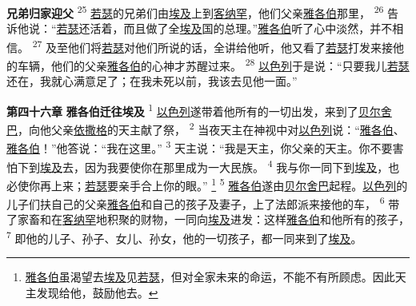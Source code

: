 \textbf{兄弟归家迎父 }
\textsuperscript{25}
\uline{若瑟}的兄弟们由\uline{埃及}上到\uline{客纳罕}，他们父亲\uline{雅各伯}那里，
\textsuperscript{26}
告诉他说：“\uline{若瑟}还活着，而且做了全\uline{埃及}国的总理。”\uline{雅各伯}听了心中淡然，并不相信。
\textsuperscript{27}
及至他们将\uline{若瑟}对他们所说的话，全讲给他听，他又看了\uline{若瑟}打发来接他的车辆，他们的父亲\uline{雅各伯}的心神才苏醒过来。
\textsuperscript{28}
\uline{以色列}于是说：“只要我儿\uline{若瑟}还在，我就心满意足了；在我未死以前，我该去见他一面。”

\textbf{第四十六章 }
\textbf{雅各伯迁往埃及 }
\textsuperscript{1}
\uline{以色列}遂带着他所有的一切出发，来到了\uline{贝尔}\uline{舍巴}，向他父亲\uline{依撒格}的天主献了祭，
\textsuperscript{2}
当夜天主在神视中对\uline{以色列}说：“\uline{雅各伯}、\uline{雅各伯}！”他答说：“我在这里。”
\textsuperscript{3}
天主说：“我是天主，你父亲的天主。你不要害怕下到\uline{埃及}去，因为我要使你在那里成为一大民族。
\textsuperscript{4}
我与你一同下到\uline{埃及}，也必使你再上来；\uline{若瑟}要亲手合上你的眼。”
\footnote{\uline{雅各伯}虽渴望去\uline{埃及}见\uline{若瑟}，但对全家未来的命运，不能不有所顾虑。因此天主发现给他，鼓励他去。}
\textsuperscript{5}
\uline{雅各伯}遂由\uline{贝尔}\uline{舍巴}起程。\uline{以色列}的儿子们扶自己的父亲\uline{雅各伯}和自己的孩子及妻子，上了法郎派来接他的车，
\textsuperscript{6}
带了家畜和在\uline{客纳罕}地积聚的财物，一同向\uline{埃及}进发：这样\uline{雅各伯}和他所有的孩子，
\textsuperscript{7}
即他的儿子、孙子、女儿、孙女，他的一切孩子，都一同来到了\uline{埃及}。

